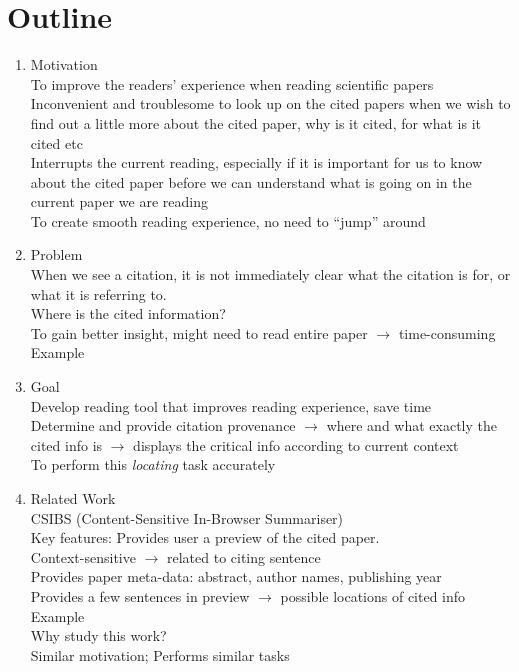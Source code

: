 \documentclass[12 pt]{article}
\begin{document}
\section*{Outline}
\begin{enumerate}
\item Motivation\\
To improve the readers' experience when reading scientific papers\\
Inconvenient and troublesome to look up on the cited papers when we wish to find out a little more about the cited paper, why is it cited, for what is it cited etc\\
Interrupts the current reading, especially if it is important for us to know about the cited paper before we can understand what is going on in the current paper we are reading\\
To create smooth reading experience, no need to ``jump'' around
\item Problem\\
When we see a citation, it is not immediately clear what the citation is for, or what it is referring to.\\
Where is the cited information?\\
To gain better insight, might need to read entire paper $\rightarrow$ time-consuming\\
Example
\item Goal\\
Develop reading tool that improves reading experience, save time\\
Determine and provide citation provenance $\rightarrow$ where and what exactly the cited info is $\rightarrow$ displays the critical info according to current context\\
To perform this \textit{locating} task accurately
\item Related Work\\
CSIBS (Content-Sensitive In-Browser Summariser)\\
Key features: Provides user a preview of the cited paper.\\
Context-sensitive $\rightarrow$ related to citing sentence\\
Provides paper meta-data: abstract, author names, publishing year\\
Provides a few sentences in preview $\rightarrow$ possible locations of cited info\\
Example\\
Why study this work?\\
Similar motivation; Performs similar tasks\\

\end{enumerate}
\end{document}
